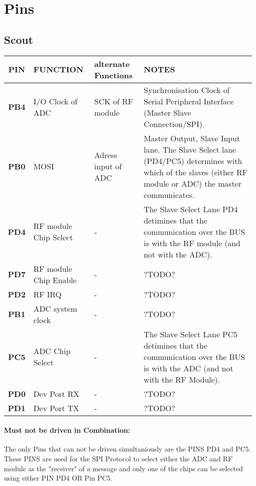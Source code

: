 \documentclass[12pt]{article}
\begin{document}
\lstset{language=C++}

\section*{Pins}


\subsection*{Scout}

\small
\begin{tabular}{| c || p{30mm} | p{30mm} | p{60mm} |}
  \hline
  \textbf{PIN} & FUNCTION & alternate Functions & NOTES\\
  \hline
  \hline
  \hline
  \textbf{PB4} & I/O Clock of ADC & SCK of RF module & Synchronisation Clock of Serial Peripheral Interface (Master Slave Connection/SPI).\\
  \hline
  \textbf{PB0} & MOSI & Adress input of ADC & Master Output, Slave Input lane. The Slave Select lane (PD4/PC5) determines with which of the slaves (either RF module or ADC) the master communicates.\\
  \hline
  \textbf{PD4} & RF module Chip Select & - & The Slave Select Lane PD4 detimines that the communication over the BUS is with the RF module (and not with the ADC).\\
  \hline
  \textbf{PD7} & RF module Chip Enable & - & ?TODO?\\
  \hline
  \textbf{PD2} & RF IRQ & - & ?TODO?\\
  \hline
  \textbf{PB1} & ADC system clock & - & ?TODO?\\
  \hline
  \textbf{PC5} & ADC Chip Select & - & The Slave Select Lane PC5 detimines that the communication over the BUS is with the ADC (and not with the RF Module).\\
  \hline
  \textbf{PD0} & Dev Port RX & - & ?TODO?\\
  \hline
  \textbf{PD1} & Dev Port TX & - & ?TODO?\\
  \hline
\end{tabular}
\normalsize

\vspace{1cm}

\paragraph{Must not be driven in Combination:}
The only Pins that can not be driven simultaniously are the PINS PD4 and PC5. These PINS are used for the SPI Protocol to select either the ADC and RF module as the "receiver" of a message and only one of the chips can be selected using either PIN PD4 OR Pin PC5.
\end{document}
